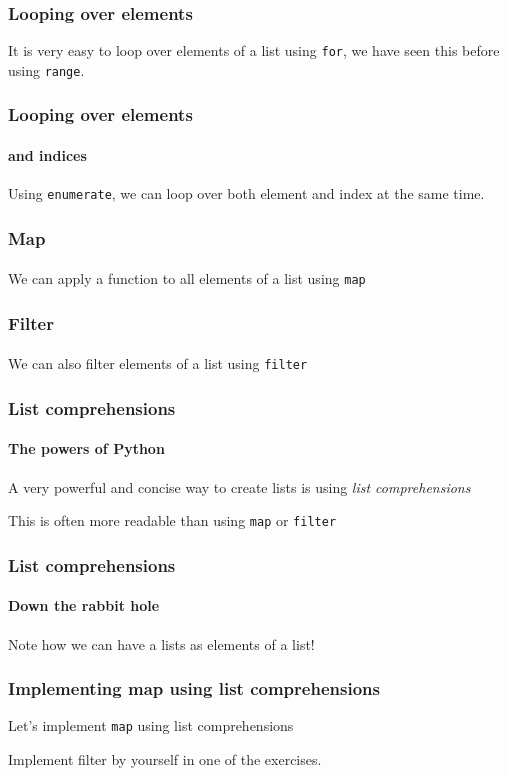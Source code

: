 \begin{frame}\frametitle{Looping over elements}

    It is very easy to loop over elements of a list using \texttt{for}, we have
    seen this before using \texttt{range}.


\end{frame}

\begin{frame}\frametitle{Looping over elements}
\framesubtitle{and indices}
    Using \texttt{enumerate}, we can loop over both element and index at the same time.


\end{frame}

\begin{frame}\frametitle{Map}
    \framesubtitle{}

    We can apply a function to all elements of a list using \texttt{map}


\end{frame}

\begin{frame}\frametitle{Filter}
    \framesubtitle{}

    We can also filter elements of a list using \texttt{filter}


\end{frame}

\begin{frame}\frametitle{List comprehensions}
    \framesubtitle{The powers of Python}

    A very powerful and concise way to create lists is using \emph{list comprehensions}


    This is often more readable than using \texttt{map} or \texttt{filter}

\end{frame}

\begin{frame}\frametitle{List comprehensions}\framesubtitle{Down the rabbit hole}


    \pause

    Note how we can have a lists as elements of a list!

\end{frame}

\begin{frame}\frametitle{Implementing map using list comprehensions}

    Let's implement \texttt{map} using list comprehensions
    \pause


    Implement filter by yourself in one of the exercises.

\end{frame}

